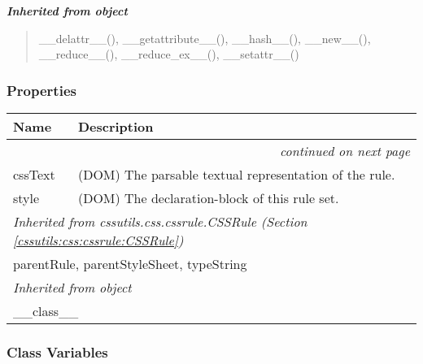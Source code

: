 \large{\textbf{\textit{Inherited from object}}}

\begin{quote}
\_\_delattr\_\_(), \_\_getattribute\_\_(), \_\_hash\_\_(), \_\_new\_\_(), \_\_reduce\_\_(), \_\_reduce\_ex\_\_(), \_\_setattr\_\_()
\end{quote}


  \subsubsection{Properties}

    \vspace{-1cm}
\hspace{\varindent}\begin{longtable}{|p{\varnamewidth}|p{\vardescrwidth}|l}
\cline{1-2}
\cline{1-2} \centering \textbf{Name} & \centering \textbf{Description}& \\
\cline{1-2}
\endhead\cline{1-2}\multicolumn{3}{r}{\small\textit{continued on next page}}\\\endfoot\cline{1-2}
\endlastfoot\raggedright c\-s\-s\-T\-e\-x\-t\- & \raggedright (DOM) The parsable textual representation of the rule.&\\
\cline{1-2}
\raggedright s\-t\-y\-l\-e\- & \raggedright (DOM) The declaration-block of this rule set.&\\
\cline{1-2}
\multicolumn{2}{|l|}{\textit{Inherited from cssutils.css.cssrule.CSSRule \textit{(Section \ref{cssutils:css:cssrule:CSSRule})}}}\\
\multicolumn{2}{|p{\varwidth}|}{\raggedright parentRule, parentStyleSheet, typeString}\\
\cline{1-2}
\multicolumn{2}{|l|}{\textit{Inherited from object}}\\
\multicolumn{2}{|p{\varwidth}|}{\raggedright \_\_class\_\_}\\
\cline{1-2}
\end{longtable}



  \subsubsection{Class Variables}

